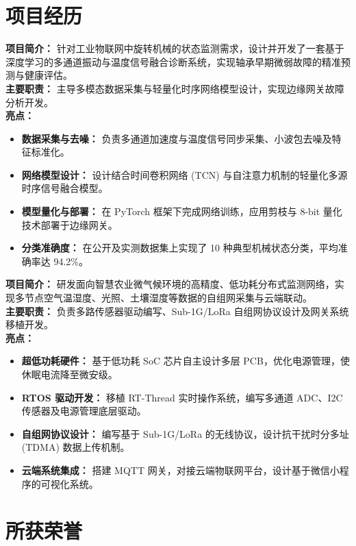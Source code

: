 \documentclass{resume}
\begin{document}
\section{项目经历}

\begin{onehalfspacing}
    \textbf{项目简介：} 针对工业物联网中旋转机械的状态监测需求，设计并开发了一套基于深度学习的多通道振动与温度信号融合诊断系统，实现轴承早期微弱故障的精准预测与健康评估。\\
    \textbf{主要职责：} 主导多模态数据采集与轻量化时序网络模型设计，实现边缘网关故障分析开发。\\
    \textbf{亮点：}
    \begin{itemize}
        \item \textbf{数据采集与去噪：} 负责多通道加速度与温度信号同步采集、小波包去噪及特征标准化。
        \item \textbf{网络模型设计：} 设计结合时间卷积网络 (TCN) 与自注意力机制的轻量化多源时序信号融合模型。
        \item \textbf{模型量化与部署：} 在 PyTorch 框架下完成网络训练，应用剪枝与 8-bit 量化技术部署于边缘网关。
        \item \textbf{分类准确度：} 在公开及实测数据集上实现了 10 种典型机械状态分类，平均准确率达 94.2\%。
    \end{itemize}
\end{onehalfspacing}

\begin{onehalfspacing}
    \textbf{项目简介：} 研发面向智慧农业微气候环境的高精度、低功耗分布式监测网络，实现多节点空气温湿度、光照、土壤湿度等数据的自组网采集与云端联动。\\
    \textbf{主要职责：} 负责多路传感器驱动编写、Sub-1G/LoRa 自组网协议设计及网关系统移植开发。\\
    \textbf{亮点：}
    \begin{itemize}
        \item \textbf{超低功耗硬件：} 基于低功耗 SoC 芯片自主设计多层 PCB，优化电源管理，使休眠电流降至微安级。
        \item \textbf{RTOS 驱动开发：} 移植 RT-Thread 实时操作系统，编写多通道 ADC、I2C 传感器及电源管理底层驱动。
        \item \textbf{自组网协议设计：} 编写基于 Sub-1G/LoRa 的无线协议，设计抗干扰时分多址 (TDMA) 数据上传机制。
        \item \textbf{云端系统集成：} 搭建 MQTT 网关，对接云端物联网平台，设计基于微信小程序的可视化系统。
    \end{itemize}
\end{onehalfspacing}

\section{所获荣誉}
\end{document}
